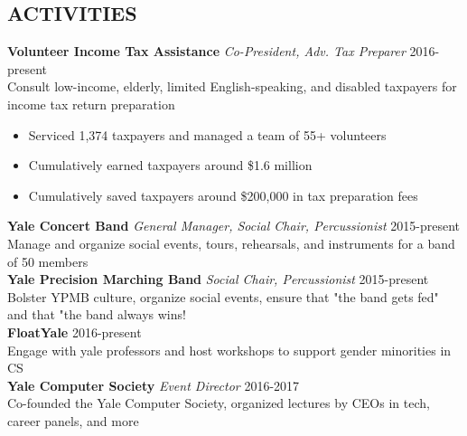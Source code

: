 \documentclass[margin, centered]{res}
\begin{document}
\begin{resume}
  \section{ACTIVITIES}
  \textbf{Volunteer Income Tax Assistance} \textit{Co-President, Adv. Tax Preparer} \hfill 2016-present \\
  Consult low-income, elderly, limited English-speaking, and disabled taxpayers for income tax return preparation
  \begin{itemize}
    \item Serviced 1,374 taxpayers and managed a team of 55+ volunteers
    \item Cumulatively earned taxpayers around \$1.6 million
    \item Cumulatively saved taxpayers around \$200,000 in tax preparation fees
    \end{itemize}
  \textbf{Yale Concert Band} \textit{General Manager, Social Chair, Percussionist} \hfill 2015-present \\
  Manage and organize social events, tours, rehearsals, and instruments for a band of 50 members \\ 
  \textbf{Yale Precision Marching Band} \textit{Social Chair, Percussionist} \hfill 2015-present \\
  Bolster YPMB culture, organize social events, ensure that "the band gets fed" and that "the band always wins! \\ 
  \textbf{FloatYale} \hfill 2016-present \\
  Engage with yale professors and host workshops to support gender minorities in CS \\ 
  \textbf{Yale Computer Society} \textit{Event Director} \hfill 2016-2017 \\
  Co-founded the Yale Computer Society, organized lectures by CEOs in tech, career panels, and more  

\end{resume}
\end{document}
